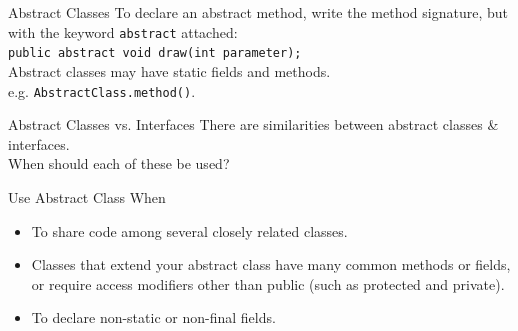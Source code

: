 \documentclass[aspectratio=169]{beamer}
\begin{document}
\begin{frame}[fragile]{Abstract Classes}
To declare an abstract method, write the method signature, but with the keyword \texttt{abstract} attached: \\
\vspace{2em}
\verb+public abstract void draw(int parameter);+\\
\vspace{2em}
Abstract classes may have static fields and methods.\\
\quad e.g. \texttt{AbstractClass.method()}.
\end{frame}



\begin{frame}{Abstract Classes vs. Interfaces}
There are similarities between abstract classes \& interfaces. \\
\vspace{1em}
When should each of these be used?
\end{frame}



\begin{frame}{Use Abstract Class When}
\begin{itemize}
\item To share code among several closely related classes.
\item Classes that extend your abstract class have many common methods or fields, or require access modifiers other than public (such as protected and private).
\item To declare non-static or non-final fields. 
\end{itemize}
\end{frame}
\end{document}
